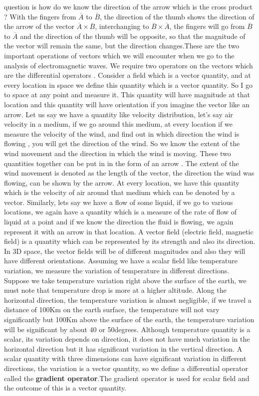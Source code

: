     question is how do we know the direction of the arrow which is the cross product ? With the fingers from $\overline{A}$ to $\overline{B}$, the direction of the thumb shows the direction of the arrow of the vector $\overline{A} \times \overline{B}$, interchanging to $\overline{B} \times \overline{A}$, the fingers will go from $\overline{B}$ to $\overline{A}$ and the direction of the thumb will be opposite, so that the magnitude of the vector will remain the same, but the direction changes.These are the two important operations of vectors which we will encounter when we go to the analysis of electromagnetic waves. We require two operators on the vectors which are the differential operators . Consider a field which is a vector quantity, and at every location in space we define this quantity which is a vector quantity. So I go to space at any point and measure it. This quantity will have magnitude at that location and this quantity will have orientation if you imagine the vector like an arrow. Let us say we have a quantity like velocity distribution, let's say air velocity in a medium, if we go around this medium, at every location if we measure the velocity of the wind, and find out in which direction the wind is flowing , you will get the direction of the wind. So we know the extent of the wind movement and the direction in which the wind is moving. These two quantities together can be put in in the form of an arrow . The extent of the wind movement is denoted as the length of the vector, the direction the wind was flowing, can be shown by the arrow. At every location, we have this quantity which is the velocity of air around that medium which can be denoted by a vector. Similarly, lets say we have a flow of some liquid, if we go to various locations, we again have a quantity which is a measure of the rate of flow of liquid at a point and if we know the direction the fluid is flowing, we again represent it with an arrow in that location. A vector field (electric field, magnetic field) is a quantity which can be represented by its strength and also its direction. In 3D space, the vector fields will be of different magnitudes and also they will have different orientations. Assuming we have a scalar field like temperature variation, we measure the variation of temperature in different directions. Suppose we take temperature variation right above the surface of the earth, we must note that temperature drop is more at a higher altitude. Along the horizontal direction, the temperature  variation is almost negligible, if we travel a distance of 100Km on the earth surface, the temperature will not vary significantly but 100Km above the surface of the earth, the temperature variation will be significant by about 40 or 50degrees. Although temperature quantity is a scalar, its variation depends on direction, it does not have much variation in the horizontal direction but it has significant variation in the vertical direction. A scalar quantity with three dimensions can have significant variation in different directions, the variation is a vector quantity, so we define a differential operator called the \textbf{gradient operator}.The gradient operator is used for scalar field and the outcome of this is a vector quantity.\\
